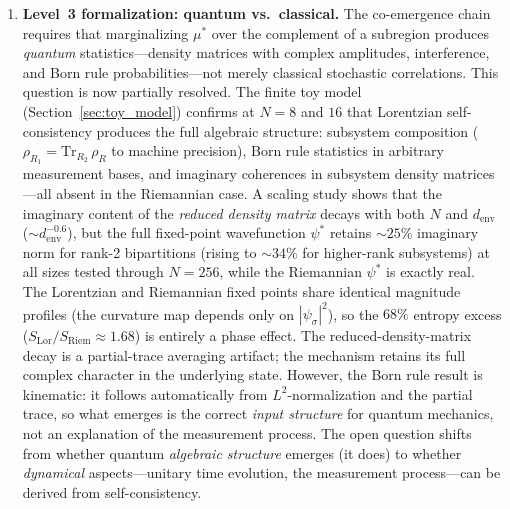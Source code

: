 \documentclass[12pt,a4paper]{article}
\theoremstyle{definition}
\theoremstyle{remark}
\begin{document}
\begin{enumerate}
\item \textbf{Level~3 formalization: quantum vs.\ classical.}
The co-emergence chain requires that marginalizing $\mu^*$ over the
complement of a subregion produces \emph{quantum} statistics---density
matrices with complex amplitudes, interference, and Born rule
probabilities---not merely classical stochastic correlations. This
question is now partially resolved. The finite toy model
(Section~\ref{sec:toy_model}) confirms at $N = 8$ and $16$ that
Lorentzian self-consistency produces the full algebraic structure:
subsystem composition ($\rho_{R_1} = \mathrm{Tr}_{R_2}\,\rho_R$ to
machine precision), Born rule statistics in arbitrary measurement bases,
and imaginary coherences in subsystem density matrices---all absent in
the Riemannian case.
A scaling study shows that the imaginary content of the
\emph{reduced density matrix} decays with both $N$ and $d_{\mathrm{env}}$
($\sim d_{\mathrm{env}}^{-0.6}$), but the full fixed-point wavefunction
$\psi^*$ retains $\sim 25\%$ imaginary norm for rank-2 bipartitions
(rising to $\sim 34\%$ for higher-rank subsystems) at all sizes tested
through $N = 256$, while the Riemannian $\psi^*$ is exactly real. The
Lorentzian and Riemannian fixed points share identical magnitude
profiles (the curvature map depends only on $|\psi_\sigma|^2$), so the
$68\%$ entropy excess
($S_{\mathrm{Lor}}/S_{\mathrm{Riem}} \approx 1.68$) is entirely a
phase effect. The reduced-density-matrix decay is a partial-trace
averaging artifact; the mechanism retains its full complex character
in the underlying state. However, the Born rule
result is kinematic: it follows
automatically from $L^2$-normalization and the partial trace, so what
emerges is the correct \emph{input structure} for quantum mechanics, not
an explanation of the measurement process. The open question shifts from
whether quantum \emph{algebraic structure} emerges (it does) to whether
\emph{dynamical} aspects---unitary time evolution, the measurement
process---can be derived from self-consistency.


\end{enumerate}
\end{document}
